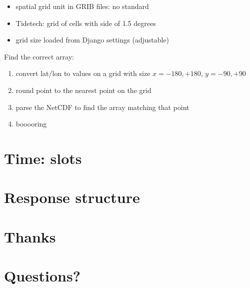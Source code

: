 \documentclass[xcolor=svgnames]{beamer}
\begin{document}
    \begin{frame}
        \begin{itemize}
            \item spatial grid unit in GRIB files: no standard
            \item Tidetech: grid of cells with side of 1.5 degrees
            \item grid size loaded from Django settings (adjustable)
        \end{itemize}
        \note{\scriptsize{}}
        \note{\scriptsize{}}
        Find the correct array:
        \begin{enumerate}
            \item convert lat/lon to values on a grid with size $x={-180,+180}$, $y={-90,+90}$
            \pause
            \item round point to the nearest point on the grid
            \pause
            \item parse the NetCDF to find the array matching that point
            \pause
            \item booooring
        \end{enumerate}
    \end{frame}

\section{Time: slots}

    \begin{frame}
    \end{frame}

\section{Response structure}

    \begin{frame}
    \end{frame}

\section{Thanks}

    \begin{frame}
    \end{frame}

\section{Questions?}
\end{document}
